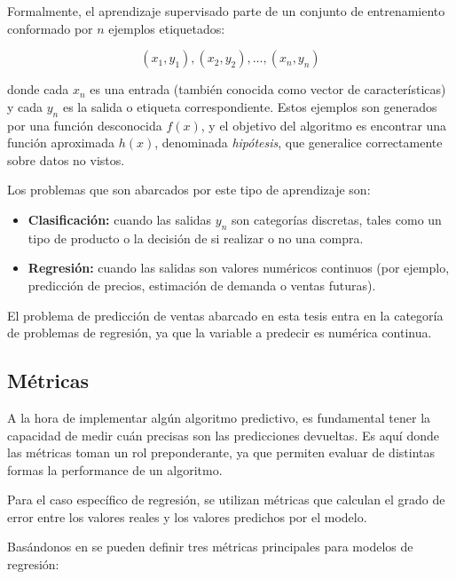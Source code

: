 Formalmente, el aprendizaje supervisado parte de un conjunto de entrenamiento conformado por $n$ ejemplos etiquetados:

\[
(x_1, y_1), (x_2, y_2), \ldots, (x_n, y_n)
\]

donde cada $x_n$ es una entrada (también conocida como vector de características) y cada $y_n$ es la salida o etiqueta correspondiente. Estos ejemplos son generados por una función desconocida $f(x)$, y el objetivo del algoritmo es encontrar una función aproximada $h(x)$, denominada \emph{hipótesis}, que generalice correctamente sobre datos no vistos.

Los problemas que son abarcados por este tipo de aprendizaje son:

\begin{itemize}
    \item \textbf{Clasificación:} cuando las salidas $y_n$ son categorías discretas, tales como un tipo de producto o la decisión de si realizar o no una compra.
    \item \textbf{Regresión:} cuando las salidas son valores numéricos continuos (por ejemplo, predicción de precios, estimación de demanda o ventas futuras).
\end{itemize}

El problema de predicción de ventas abarcado en esta tesis entra en la categoría de problemas de regresión, ya que la variable a predecir es numérica continua.

\subsection{Métricas}

A la hora de implementar algún algoritmo predictivo, es fundamental tener la capacidad de medir cuán precisas son las predicciones devueltas. Es aquí donde las métricas toman un rol preponderante, ya que permiten evaluar de distintas formas la performance de un algoritmo.

Para el caso específico de regresión, se utilizan métricas que calculan el grado de error entre los valores reales y los valores predichos por el modelo.

Basándonos en \parencite{hyndman2018forecasting, james2013isl} se pueden definir tres métricas principales para modelos de regresión:

